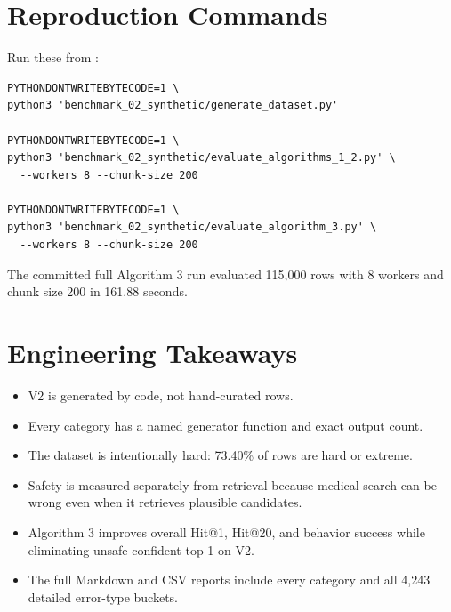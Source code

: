 \documentclass[11pt]{article}
\begin{document}
\section{Reproduction Commands}

Run these from :

\begin{verbatim}
PYTHONDONTWRITEBYTECODE=1 \
python3 'benchmark_02_synthetic/generate_dataset.py'

PYTHONDONTWRITEBYTECODE=1 \
python3 'benchmark_02_synthetic/evaluate_algorithms_1_2.py' \
  --workers 8 --chunk-size 200

PYTHONDONTWRITEBYTECODE=1 \
python3 'benchmark_02_synthetic/evaluate_algorithm_3.py' \
  --workers 8 --chunk-size 200
\end{verbatim}

The committed full Algorithm 3 run evaluated 115,000 rows with 8 workers and chunk
size 200 in 161.88 seconds.

\section{Engineering Takeaways}

\begin{itemize}
  \item V2 is generated by code, not hand-curated rows.
  \item Every category has a named generator function and exact output count.
  \item The dataset is intentionally hard: 73.40\% of rows are hard or extreme.
  \item Safety is measured separately from retrieval because medical search can
        be wrong even when it retrieves plausible candidates.
  \item Algorithm 3 improves overall Hit@1, Hit@20, and
        behavior success while eliminating unsafe confident top-1 on V2.
  \item The full Markdown and CSV reports include every category and all 4,243
        detailed error-type buckets.
\end{itemize}
\end{document}

